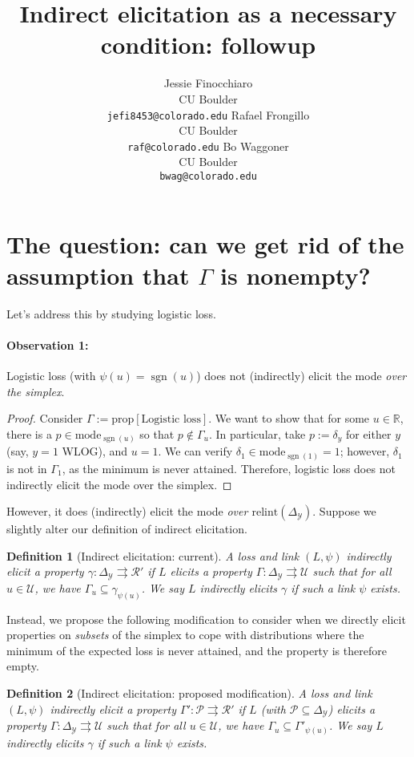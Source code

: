 \documentclass{article}
\title{Indirect elicitation as a necessary condition: followup}
\author{%
  Jessie Finocchiaro\\
  CU Boulder\\
  \texttt{jefi8453@colorado.edu} 
  \And
   Rafael Frongillo\\
   CU Boulder\\
   \texttt{raf@colorado.edu} 
   \And
   Bo Waggoner\\
   CU Boulder \\
   \texttt{bwag@colorado.edu} 
}
\newcommand{\reals}{\mathbb{R}}
\newcommand{\simplex}{\Delta_\Y}
\newcommand{\relint}[1]{\mathrm{relint}(#1)}
\newcommand{\prop}[1]{\mathrm{prop}[#1]}
\newcommand{\R}{\mathcal{R}}
\renewcommand{\P}{\mathcal{P}}
\newcommand{\U}{\mathcal{U}}
\newcommand{\Y}{\mathcal{Y}}
\newcommand{\toto}{\rightrightarrows}
\newtheorem{definition}{Definition}
\DeclareMathOperator*{\sgn}{sgn}
\begin{document}
\maketitle

\section{The question: can we get rid of the assumption that $\Gamma$ is nonempty?}
Let's address this by studying logistic loss.


\paragraph{Observation 1:} Logistic loss (with $\psi(u) = \sgn(u)$) does not (indirectly) elicit the mode \emph{over the simplex}.
\begin{proof}
	Consider $\Gamma := \prop{\text{Logistic loss}}$.
	We want to show that for some $u \in \reals$, there is a $p \in \mathrm{mode}_{\sgn(u)}$ so that $p \not \in \Gamma_u$.
	In particular, take $p := \delta_y$ for either $y$ (say, $y = 1$ WLOG), and $u = 1$.
	We can verify $\delta_1 \in \mathrm{mode}_{\sgn(1)} = 1$; however, $\delta_1$ is not in $\Gamma_1$, as the minimum is never attained.
	Therefore, logistic loss does not indirectly elicit the mode over the simplex.
\end{proof}

However, it does (indirectly) elicit the mode \emph{over $\relint{\simplex}$}.
Suppose we slightly alter our definition of indirect elicitation.

\begin{definition}[Indirect elicitation: current]
	A loss and link $(L, \psi)$ \emph{indirectly elicit} a property $\gamma:\simplex \toto \R'$ if $L$ elicits a property $\Gamma: \simplex \toto \U$ such that for all $u \in \U$, we have $\Gamma_u \subseteq \gamma_{\psi(u)}$.
	We say $L$ \emph{indirectly elicits} $\gamma$ if such a link $\psi$ exists.
\end{definition}

Instead, we propose the following modification to consider when we directly elicit properties on \emph{subsets} of the simplex to cope with distributions where the minimum of the expected loss is never attained, and the property is therefore empty.


\begin{definition}[Indirect elicitation: proposed modification]
	A loss and link $(L, \psi)$ \emph{indirectly elicit} a property $\Gamma':\P \toto \R'$ if $L$ (with $\P \subseteq \simplex$) elicits a property $\Gamma: \simplex \toto \U$ such that for all $u \in \U$, we have $\Gamma_u \subseteq \Gamma'_{\psi(u)}$.
	We say $L$ \emph{indirectly elicits} $\gamma$ if such a link $\psi$ exists.
\end{definition}
\end{document}
